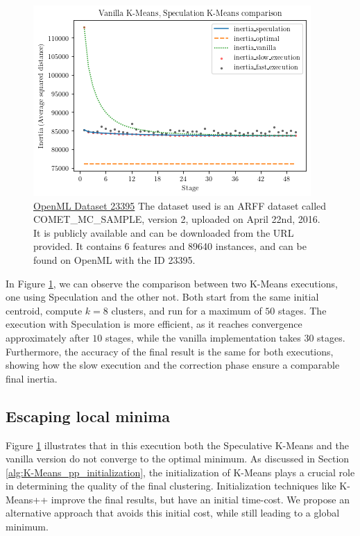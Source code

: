 \begin{figure}[ht]
\centering
\includegraphics[width=\linewidth]{./plots/vanilla_speculation_comparison.png}
\caption{\href{https://www.openml.org/d/23395}{OpenML Dataset 23395} The dataset used is an ARFF dataset called COMET\_MC\_SAMPLE, version 2, uploaded on April 22nd, 2016. It is publicly available and can be downloaded from the URL provided. It contains 6 features and 89640 instances, and can be found on OpenML with the ID 23395.}
\label{fig:vanilla_speculation_comparison}
\end{figure}
In Figure \ref{fig:vanilla_speculation_comparison}, we can observe the comparison between two K-Means executions, one using Speculation and the other not. Both start from the same initial centroid, compute $k=8$ clusters, and run for a maximum of $50$ stages.
The execution with Speculation is more efficient, as it reaches convergence approximately after $10$ stages, while the vanilla implementation takes $30$ stages. Furthermore, the accuracy of the final result is the same for both executions, showing how the slow execution and the correction phase ensure a comparable final inertia.


\subsection{Escaping local minima}
\label{section:escaping_local_minima}
Figure \ref{fig:vanilla_speculation_comparison} illustrates that in this execution both the Speculative K-Means and the vanilla version do not converge to the optimal minimum. As discussed in Section \ref{alg:K-Means_pp_initialization}, the initialization of K-Means plays a crucial role in determining the quality of the final clustering. Initialization techniques like K-Means++ improve the final results, but have an initial time-cost. We propose an alternative approach that avoids this initial cost, while still leading to a global minimum.

